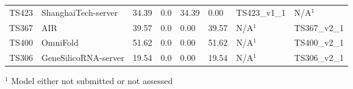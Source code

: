 \begin{table}[ht]
{\begin{tabular}{llllllll}
TS423 & ShanghaiTech-server & 34.39 & 0.0 & 34.39 & 0.00 & TS423\_v1\_1 & N/A$^{1}$ \\ 
TS367 & AIR & 39.57 & 0.0 & 0.00 & 39.57 & N/A$^{1}$ & TS367\_v2\_1 \\ 
TS400 & OmniFold & 51.62 & 0.0 & 0.00 & 51.62 & N/A$^{1}$ & TS400\_v2\_1 \\ 
TS306 & GeneSilicoRNA-server & 19.54 & 0.0 & 0.00 & 19.54 & N/A$^{1}$ & TS306\_v2\_1 \\ 
\bottomrule
\end{tabular}%
}
\begin{flushleft}\footnotesize $^{1}$ Model either not submitted or not assessed\end{flushleft}
\end{table}
